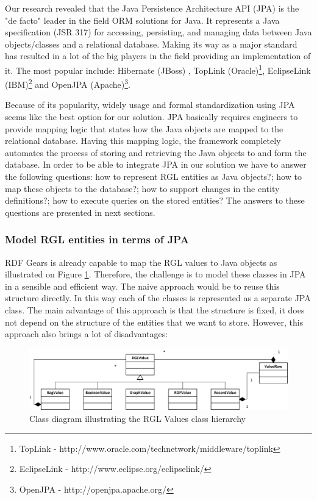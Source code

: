 Our research revealed that the Java Persistence Architecture API (JPA) is the "de facto" leader in the field ORM solutions for Java. It represents a Java specification (JSR 317) for accessing, persisting, and managing data between Java objects/classes and a relational database. Making its way as a major standard has resulted in a lot of the big players in the field providing an implementation of it. The most popular include: Hibernate (JBoss) \cite{linwood2010beginning}, TopLink (Oracle)\footnote{TopLink - http://www.oracle.com/technetwork/middleware/toplink}, EclipseLink (IBM)\footnote{EclipseLink - http://www.eclipse.org/eclipselink/} and OpenJPA (Apache)\footnote{OpenJPA - http://openjpa.apache.org/}. 

Because of its popularity, widely usage and formal standardization using JPA seems like the best option for our solution. JPA basically requires engineers to provide mapping logic that states how the Java objects are mapped to the relational database. Having this mapping logic, the framework completely automates the process of storing and retrieving the Java objects to and form the database. In order to be able to integrate JPA in our solution we have to answer the following questions: how to represent RGL entities as Java objects?; how to map these objects to the database?; how to support changes in the entity definitions?; how to execute queries on the stored entities? The answers to these questions are presented in next sections.


\subsubsection{Model RGL entities in terms of JPA}

RDF Gears is already capable to map the RGL values to Java objects as illustrated on Figure \ref{fig_rglValuesClassDiag}. Therefore, the challenge is to model these classes in JPA in a sensible and efficient way. The naive approach would be to reuse this structure directly. In this way each of the classes is represented as a separate JPA class. The main advantage of this approach is that the structure is fixed, it does not depend on the structure of the entities that we want to store. However, this approach also brings a lot of disadvantages: 

\begin{figure}[h!]
  \centering
  	\includegraphics[scale=0.8]{storage/diagrams/RGLValues.png}
  \caption{Class diagram illustrating the RGL Values class hierarchy}
  \label{fig_rglValuesClassDiag}
\end{figure}


